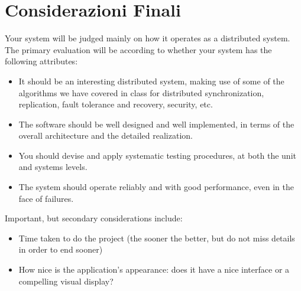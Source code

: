 \chapter{Considerazioni Finali}

Your system will be judged mainly on how it operates as a distributed system. The primary evaluation will be according to whether your system has the following attributes:

\begin{itemize}
	\item It should be an interesting distributed system, making use of some of	the algorithms we have covered in class for distributed synchronization, replication, fault tolerance and recovery, security, etc.
	\item The software should be well designed and well implemented, in terms of the overall architecture and the detailed realization. 
	\item You should devise and apply systematic testing procedures, at both the unit and systems levels.
	\item The system should operate reliably and with good performance, even in the face of failures.
\end{itemize}

Important, but secondary considerations include:

\begin{itemize}
	\item Time taken to do the project (the sooner the better, but do not miss details in order to end sooner)
	\item How nice is the application's appearance: does it have a nice interface or a compelling visual display?
\end{itemize}

